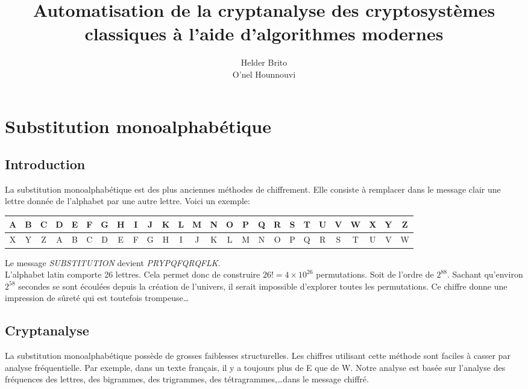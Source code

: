 \documentclass[a4paper]{article}
\title{Automatisation de la cryptanalyse des cryptosystèmes classiques
à l’aide d’algorithmes modernes}
\author{Helder Brito\\O'nel Hounnouvi}
\date{}
\begin{document}
\maketitle 
\section{Substitution monoalphabétique}
\subsection{Introduction}
La substitution monoalphabétique est des plus anciennes méthodes de chiffrement. Elle consiste
à remplacer dans le message clair une lettre donnée de l'alphabet par une autre lettre. Voici un exemple:

\vspace{1em}
    \begin{adjustbox}{width=\textwidth,center}
        \begin{tabular}{|c|c|c|c|c|c|c|c|c|c|c|c|c|c|c|c|c|c|c|c|c|c|c|c|c|c|}
            \hline
            A & B & C & D & E & F & G & H & I & J & K & L & M & N & O & P & Q & R & S & T & U & V & W & X & Y & Z \\
            \hline
            X & Y & Z & A & B & C & D & E & F & G & H & I & J & K & L & M & N & O & P & Q & R & S & T & U & V & W \\
            \hline
        \end{tabular}
    \end{adjustbox}
\vspace{1em}

Le message \textit{SUBSTITUTION} devient \textit{PRYPQFQRQFLK}.\\

L'alphabet latin comporte 26 lettres. Cela permet donc de construire $26! = 4 \times 10^{26}$ permutations. Soit de l'ordre de $2^{88}$.
Sachant qu'environ $2^{58}$ secondes se sont écoulées depuis la création de l'univers, il serait impossible d'explorer toutes les permutations.
Ce chiffre donne une impression de sûreté qui est toutefois trompeuse\ldots

\subsection{Cryptanalyse}
La substitution monoalphabétique possède de grosses faiblesses structurelles. Les chiffres utilisant cette méthode sont faciles à casser par 
analyse fréquentielle. Par exemple, dans un texte français, il y a toujours plus de E que de W. Notre analyse est basée sur l'analyse des 
fréquences des lettres, des bigrammes, des trigrammes, des tétragrammes,\ldots dans le message chiffré.
\end{document}
